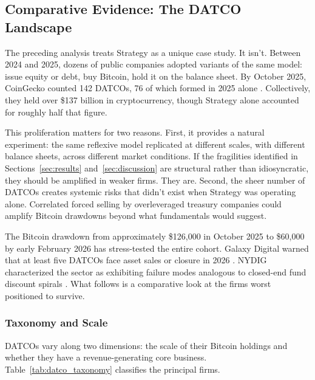 \subsection{Comparative Evidence: The DATCO Landscape}
\label{sec:datco_landscape}

The preceding analysis treats Strategy as a unique case study. It isn't. Between 2024 and 2025, dozens of public companies adopted variants of the same model: issue equity or debt, buy Bitcoin, hold it on the balance sheet. By October 2025, CoinGecko counted 142 DATCOs, 76 of which formed in 2025 alone \citep{coingecko2025datco}. Collectively, they held over \$137 billion in cryptocurrency, though Strategy alone accounted for roughly half that figure.

This proliferation matters for two reasons. First, it provides a natural experiment: the same reflexive model replicated at different scales, with different balance sheets, across different market conditions. If the fragilities identified in Sections~\ref{sec:results} and~\ref{sec:discussion} are structural rather than idiosyncratic, they should be amplified in weaker firms. They are. Second, the sheer number of DATCOs creates systemic risks that didn't exist when Strategy was operating alone. Correlated forced selling by overleveraged treasury companies could amplify Bitcoin drawdowns beyond what fundamentals would suggest.

The Bitcoin drawdown from approximately \$126,000 in October 2025 to \$60,000 by early February 2026 has stress-tested the entire cohort. Galaxy Digital warned that at least five DATCOs face asset sales or closure in 2026 \citep{galaxy2026treasury}. NYDIG characterized the sector as exhibiting failure modes analogous to closed-end fund discount spirals \citep{nydig2025howdatsdie}. What follows is a comparative look at the firms worst positioned to survive.

\subsubsection{Taxonomy and Scale}

DATCOs vary along two dimensions: the scale of their Bitcoin holdings and whether they have a revenue-generating core business. Table~\ref{tab:datco_taxonomy} classifies the principal firms.


